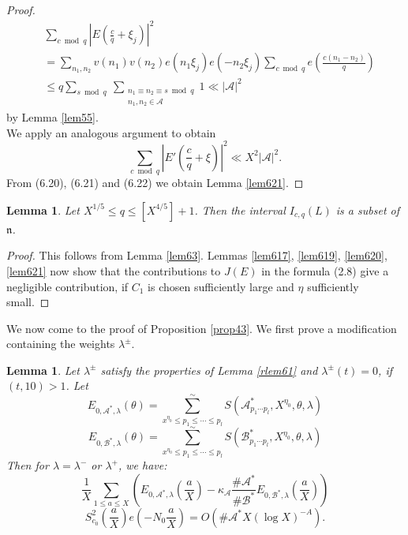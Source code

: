 \documentclass{amsart}
\newtheorem{lemma}[theorem]{Lemma}
\numberwithin{equation}{subsection}
\begin{document}
\begin{proof}
\begin{align*}
&\sum_{c\bmod q} \left| E\left(\frac{c}{q}+\xi_j\right)\right|^2 \tag{6.21}\\ 
&=\sum_{n_1, n_2} v(n_1) v(n_2) e(n_1\xi_j)e(-n_2\xi_j)\sum_{c\bmod q} e\left(\frac{c(n_1-n_2)}{q}\right)\\
&\leq q\sum_{s \bmod q}\ \sum_{\substack{n_1\equiv n_2 \equiv s \bmod q \\ n_1, n_2\in\mathcal{A}}} 1 \ll |\mathcal{A}|^2
\end{align*}
by Lemma \ref{lem55}.\\
We apply an analogous argument to obtain
\[
\sum_{c\bmod q}\left| E'\left(\frac{c}{q}+\xi\right) \right|^2 \ll X^2 |\mathcal{A}|^2.  \tag{6.22}
\]
From (6.20), (6.21) and (6.22) we obtain Lemma \ref{lem621}.
\end{proof}

\begin{lemma}\label{lem622}
Let $X^{1/5}\leq q\leq [X^{4/5}]+1$. Then the interval $I_{c,q}(L)$ is a subset of $\mathfrak{n}$.
\end{lemma}
\begin{proof}
This follows from Lemma \ref{lem63}. Lemmas \ref{lem617}, \ref{lem619}, \ref{lem620},\ref{lem621} now show that the contributions to $J(E)$ in the formula (2.8) give a negligible contribution, if $C_1$ is chosen sufficiently large and $\eta$ sufficiently small.
\end{proof}


We now come to the proof of Proposition \ref{prop43}. We first prove a modification containing the weights $\lambda^\pm$.

\begin{lemma}\label{rlem616}
Let $\lambda^\pm$ satisfy the properties of Lemma \ref{rlem61} and $\lambda^\pm(t)=0$, if $(t, 10)>1$. Let
$$E_{0, \mathcal{A}^*, \lambda}(\theta)=\sum_{x^{\eta_0}\leq p_1\leq \cdots \leq p_l}^\sim S(\mathcal{A}_{p_1\cdots p_l}^*, X^{\eta_0}, \theta, \lambda)$$
$$E_{0, \mathcal{B}^*, \lambda}(\theta)=\sum_{x^{\eta_0}\leq p_1\leq \cdots \leq p_l}^\sim S(\mathcal{B}_{p_1\cdots p_l}^*, X^{\eta_0}, \theta, \lambda)$$
Then for $\lambda=\lambda^-$ or $\lambda^+$, we have:
$$\frac{1}{X}\sum_{1\leq a\leq X} \left( E_{0, \mathcal{A}^*, \lambda}\left(\frac{a}{X}\right)-\kappa_{\mathcal{A}}\frac{\#\mathcal{A}^*}{\#\mathcal{B}^*} E_{0, \mathcal{B}^*, \lambda}\left(\frac{a}{X}\right)\right)$$
$$S_{c_0}^2\left(\frac{a}{X}\right)e\left(-N_0 \frac{a}{X}\right)=O\left(\# \mathcal{A}^* X(\log X)^{-A}  \right).$$
\end{lemma}
\end{document}

